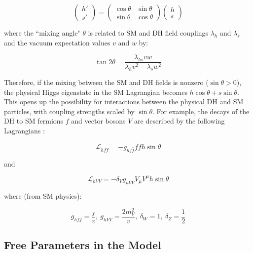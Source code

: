 \begin{equation}
\label{eq:higgs_mass_eigenstates}
\begin{pmatrix}
h' \\ s'
\end{pmatrix} = 
\begin{pmatrix}
\cos\theta & \sin\theta \\
\sin\theta & \cos\theta 
\end{pmatrix}
\begin{pmatrix}
h \\ s
\end{pmatrix}
\end{equation}

\noindent where the ``mixing angle" \(\theta\) is related to SM and DH field couplings \(\lambda_h\) and \(\lambda_s\) and the vacuum expectation values \(v\) and \(w\) by:

\begin{equation}
\label{eq:higgs_mixing_angle}
\tan2\theta = \frac{\lambda_{hs}vw}{\lambda_hv^2 - \lambda_sw^2}
\end{equation}

Therefore, if the mixing between the SM and DH fields is nonzero (\(\sin\theta > 0\)), the physical Higgs eigenstate in the SM Lagrangian becomes \(h\cos\theta + s\sin\theta\). This opens up the possibility for interactions between the physical DH and SM particles, with coupling strengths scaled by \(\sin\theta\). For example, the decays of the DH to SM fermions \(f\) and vector bosons \(V\) are described by the following Lagrangians \cite{Duerr_2016, PDG_2018}:  

\begin{equation}
\mathcal{L}_{hf\bar{f}} = -g_{hf\bar{f}}\bar{f}f h\sin\theta 
\end{equation}

\noindent and

\begin{equation}
\mathcal{L}_{hVV} = -\delta_V g_{hVV}V_\mu V^\mu h\sin\theta 
\end{equation}

\noindent where (from SM physics):

\begin{equation}
g_{hf\bar{f}} = \frac{_f}{v}, ~ g_{hVV} = \frac{2m_V^2}{v}, ~ \delta_W = 1, ~ \delta_Z = \frac{1}{2}
\end{equation}

\subsection{Free Parameters in the Model}
\label{sec:dh_model_free_parameters}

